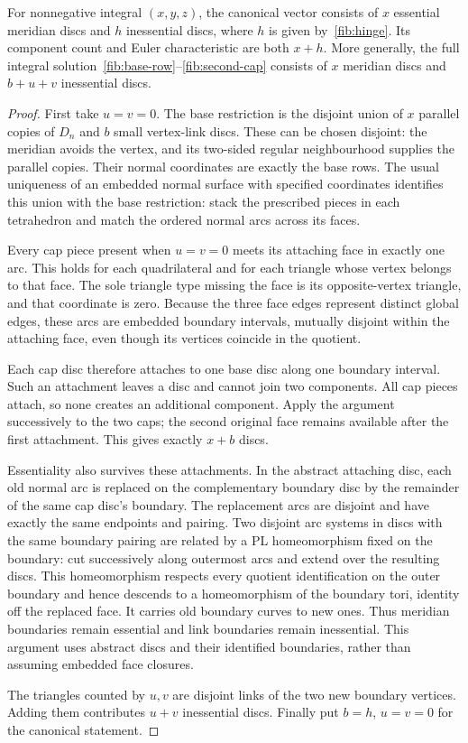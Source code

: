 \begin{theorem}
\label{fib:disc-census}
For nonnegative integral \((x,y,z)\), the canonical vector consists of
\(x\) essential meridian discs and \(h\) inessential discs, where
\(h\) is given by~\eqref{fib:hinge}.  Its component count and Euler
characteristic are both \(x+h\).  More generally, the full integral
solution~\eqref{fib:base-row}--\eqref{fib:second-cap} consists of
\(x\) meridian discs and \(b+u+v\) inessential discs.
\end{theorem}
\begin{proof}
First take \(u=v=0\).  The base restriction is the disjoint union of
\(x\) parallel copies of \(D_n\) and \(b\) small vertex-link discs.
These can be chosen disjoint: the meridian avoids the vertex, and its
two-sided regular neighbourhood supplies the parallel copies.  Their
normal coordinates are exactly the base rows.  The usual uniqueness of
an embedded normal surface with specified coordinates identifies this
union with the base restriction: stack the prescribed pieces in each
tetrahedron and match the ordered normal arcs across its faces.

Every cap piece present when \(u=v=0\) meets its attaching face in
exactly one arc.  This holds for each quadrilateral and for each triangle
whose vertex belongs to that face.  The sole triangle type missing the
face is its opposite-vertex triangle, and that coordinate is zero.
Because the three face edges represent distinct global edges, these arcs
are embedded boundary intervals, mutually disjoint within the attaching
face, even though its vertices coincide in the quotient.

Each cap disc therefore attaches to one base disc along one boundary
interval.  Such an attachment leaves a disc and cannot join two
components.  All cap pieces attach, so none creates an additional
component.  Apply the argument successively to the two caps; the second
original face remains available after the first attachment.  This gives
exactly \(x+b\) discs.

Essentiality also survives these attachments.  In the abstract attaching
disc, each old normal arc is replaced on the complementary boundary disc
by the remainder of the same cap disc's boundary.  The replacement arcs
are disjoint and have exactly the same endpoints and pairing.
Two disjoint arc systems in discs with the same boundary pairing are
related by a PL homeomorphism fixed on the boundary: cut successively
along outermost arcs and extend over the resulting discs.  This
homeomorphism respects every quotient identification on the outer
boundary and hence descends to a homeomorphism of the boundary tori,
identity off the replaced face.  It carries old boundary curves to new
ones.  Thus meridian boundaries remain essential and link boundaries
remain inessential.  This argument uses abstract discs and their
identified boundaries, rather than assuming embedded face closures.

The triangles counted by \(u,v\) are disjoint links of the two new
boundary vertices.  Adding them contributes \(u+v\) inessential discs.
Finally put \(b=h\), \(u=v=0\) for the canonical statement.
\end{proof}

